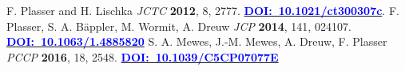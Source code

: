 \documentclass[DIV=12,headings=normal]{scrartcl}
\newcommand{\doi}[1]{\href{http://dx.doi.org/#1}{\textcolor{blue}{\bf DOI:~#1}}}
\begin{document}
\begin{thebibliography}{9}
 F. Plasser and H. Lischka \textit{JCTC} \textbf{2012}, 8, 2777. \doi{10.1021/ct300307c}.
 F. Plasser, S. A. B\"appler, M. Wormit, A. Dreuw \textit{JCP} \textbf{2014}, 141, 024107. \doi{10.1063/1.4885820}
 S. A. Mewes, J.-M. Mewes, A. Dreuw, F. Plasser \textit{PCCP} \textbf{2016}, 18, 2548. \doi{10.1039/C5CP07077E}
\end{thebibliography}
\end{document}
